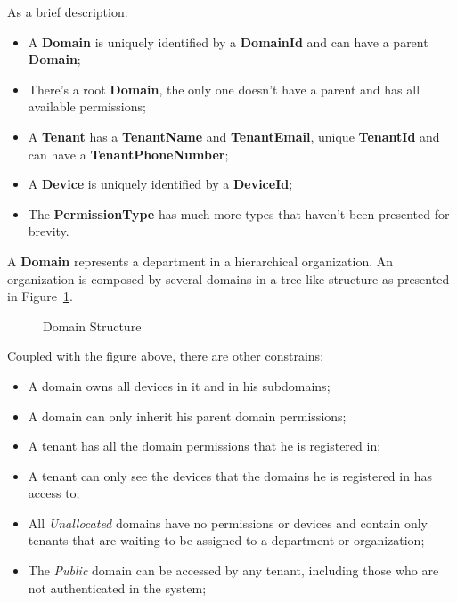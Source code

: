 As a brief description:

\begin{itemize}
   \item A \textbf{Domain} is uniquely identified by a \textbf{DomainId} and can have a parent \textbf{Domain};
   \item There's a root \textbf{Domain}, the only one doesn't have a parent and has all available permissions;
   \item A \textbf{Tenant} has a \textbf{TenantName} and \textbf{TenantEmail}, unique \textbf{TenantId} and can have a \textbf{TenantPhoneNumber};
   \item A \textbf{Device} is uniquely identified by a \textbf{DeviceId};
   \item The \textbf{PermissionType} has much more types that haven't been presented for brevity.
\end{itemize}

A \textbf{Domain} represents a department in a hierarchical organization. An organization is composed by several domains in a tree like structure as presented in Figure~\ref{fig:design:domain:bounded_contexts:identity:organization}.

\begin{figure}[H]
   \centering
  \resizebox{\columnwidth}{!}
  {
     
  }
  \caption[Domain Structure]{Domain Structure}
  \label{fig:design:domain:bounded_contexts:identity:organization}
\end{figure}

Coupled with the figure above, there are other constrains:

\begin{itemize}
   \item A domain owns all devices in it and in his subdomains;
   \item A domain can only inherit his parent domain permissions;
   \item A tenant has all the domain permissions that he is registered in;
   \item A tenant can only see the devices that the domains he is registered in has access to;
   \item All \textit{Unallocated} domains have no permissions or devices and contain only tenants that are waiting to be assigned to a department or organization;
   \item The \textit{Public} domain can be accessed by any tenant, including those who are not authenticated in the system;
\end{itemize}

